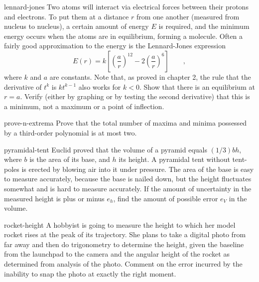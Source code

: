 \begin{hwsection}
\begin{hwwithsoln}{lennard-jones}
Two atoms will interact via electrical forces between
their protons and electrons. To put them at a distance $r$ from one another (measured from
nucleus to nucleus), a certain amount of energy $E$ is required, and the minimum energy
occurs when the atoms are in equilibrium, forming a molecule. Often a fairly good approximation
to the energy is the Lennard-Jones expression
\begin{equation*}
  E(r) = k\left[\left(\frac{a}{r}\right)^{12}-2\left(\frac{a}{r}\right)^6\right] \qquad ,
\end{equation*}
where $k$ and $a$ are constants. Note that, as proved in chapter 2, the rule that
the derivative of $t^k$ is $kt^{k-1}$ also works for $k<0$.
Show that there is an equilibrium at $r=a$. Verify (either by graphing or by testing
the second derivative) that this is a minimum, not a maximum or a point of inflection.
\end{hwwithsoln}

\begin{hwwithsoln}{prove-n-extrema}
Prove that the total number of maxima and minima possessed by a third-order polynomial
is at most two.
\end{hwwithsoln}

\begin{hwwithsoln}{pyramidal-tent}
Euclid proved that the volume of a pyramid equals $(1/3)bh$, where $b$ is the area of its
base, and $h$ its height. A pyramidal tent without tent-poles is erected by blowing air
into it under pressure. The area of the base is easy to measure accurately, because the
base is nailed down, but the height fluctuates somewhat and is hard to measure accurately.
If the amount of uncertainty in the measured height is plus or minus $e_h$, find the
amount of possible error $e_V$ in the volume.
\end{hwwithsoln}

\begin{hwwithsoln}{rocket-height}
A hobbyist is going to measure the height to which her model rocket rises at the peak of
its trajectory. She plans to
take a digital photo from far away and then do trigonometry to determine the height,
given the baseline from the launchpad to the camera and the angular height of the rocket
as determined from analysis of the photo. Comment on the error incurred by the inability to
snap the photo at exactly the right moment.
\end{hwwithsoln}

\end{hwsection}
